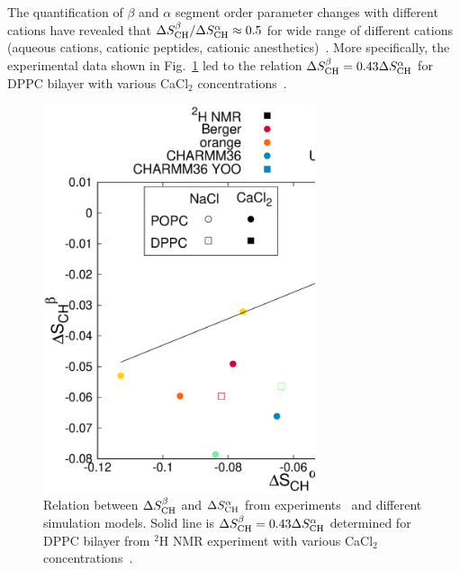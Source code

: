 \documentclass[pre,aps,floatfix,authordate1-4,twocolumn]{revtex4-1}
\begin{document}
The quantification of $\beta$ and $\alpha$ segment order parameter changes 
with different cations
have revealed that $\Delta S_{\rm{CH}}^{\beta}/\Delta S_{\rm{CH}}^{\alpha} \approx0.5$ for wide range
of different cations (aqueous cations, cationic peptides, cationic anesthetics)~\cite{beschiasvili91,rydall92}.
More specifically, the experimental data shown in Fig.~\ref{AvsB} led to the 
relation $\Delta S_{\rm{CH}}^{\beta}=0.43\Delta S_{\rm{CH}}^{\alpha}$ for DPPC bilayer
with various CaCl$_2$ concentrations~\cite{akutsu81}.
\begin{figure}[]
  \centering
  \includegraphics[width=8cm]{../Fig/OrderParameterAvsB.eps}
  \caption{\label{AvsB}
    Relation between $\Delta S_{\rm{CH}}^{\beta}$ and $\Delta S_{\rm{CH}}^{\alpha}$ from experiments~\cite{akutsu81} and
    different simulation models. Solid line is $\Delta S_{\rm{CH}}^{\beta}=0.43\Delta S_{\rm{CH}}^{\alpha}$ determined for DPPC bilayer
    from $^2$H NMR experiment with various CaCl$_2$ concentrations~\cite{akutsu81}.
  }
\end{figure}
\end{document}
